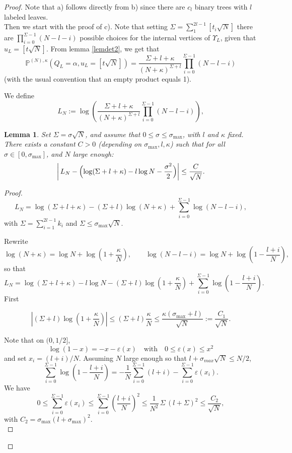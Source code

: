 \documentclass[10pt,a4paper]{amsart}
\newtheorem{lemma}{Lemma}
\begin{document}
\begin{proof}
Note that a) follows directly from b) since there are $c_l$ binary trees with $l$ labeled leaves.\\
Then we start with the proof of c). Note that setting $\Sigma=\sum_1^{2l-1}[t_i\sqrt N]$
 there are $\prod_{i=0}^{\Sigma-1}(N-l-i)$ possible choices for the internal vertices of $\Upsilon_L$, given that $u_L=[t\sqrt N]$.
From lemma \ref{lemdet2}, we get that $$\mathbb P^{(N),\kappa} (Q_L=\alpha, u_L=[t\sqrt N])=\frac{\Sigma+l+\kappa}{(N+\kappa)^{\Sigma+l}}\prod_{i=0}^{\Sigma -1}(N-l-i)$$ (with the usual convention that an empty product equals 1).
 

We define
\[
L_N:=\log(\frac{\Sigma+l+\kappa}{(N+\kappa)^{\Sigma+l}}\prod_{i=0}^{\Sigma-1}(N-l-i)),\]

\begin{lemma}
Set $\Sigma=\sigma\sqrt N$, and assume that
$0\le \sigma\le \sigma_{\max}$, with \(l\) and \(\kappa\) fixed.  
There exists a constant \(C>0\)  (depending on
\(\sigma_{\max},l,\kappa\)) such that for all 
\(\sigma\in[0,\sigma_{\max}]\), and $N$ large enough:
\[
\left|\,L_N-\Bigl(\log(\Sigma+l+\kappa)-l\log N-\frac{\sigma^2}{2}\Bigr)\right|
\le \frac{C}{\sqrt N}.
\]
\end{lemma}
\begin{proof}

\[
L_N=\log(\Sigma+l+\kappa)-(\Sigma+l)\log(N+\kappa)
+\sum_{i=0}^{\Sigma-1}\log(N-l-i),
\]
with $\Sigma=\sum_{i=1}^{2l-1}k_i$ and
$\Sigma\le \sigma_{\max}\sqrt N$.

\medskip
\noindent
Rewrite
\[
\log(N+\kappa)=\log N+\log\!\left(1+\frac{\kappa}{N}\right),
\qquad
\log(N-l-i)=\log N+\log\!\left(1-\frac{l+i}{N}\right),
\]
so that
\[
L_N=\log(\Sigma+l+\kappa)-l\log N
-(\Sigma+l)\log\!\left(1+\frac{\kappa}{N}\right)
+\sum_{i=0}^{\Sigma-1}\log\!\left(1-\frac{l+i}{N}\right).
\]
First

\[
\left|(\Sigma+l)\log\!\left(1+\frac{\kappa}{N}\right)\right|
\le
(\Sigma+l)\frac{\kappa}{N}\le
\frac{\kappa(\sigma_{\max}+l)}{\sqrt N}
:=
\frac{C_1}{\sqrt N}.
\]

\medskip
\noindent
Note that on $(0, 1/2]$,
\[
\log(1-x)=-x-\varepsilon(x)
\quad \text{with}\quad
0\le \varepsilon(x) \le x^2
\]
and set $x_i=(l+i)/N$. Assuming $N$ large enough so that $l+\sigma_{max}\sqrt N\le N/2$,
\[
\sum_{i=0}^{\Sigma-1}\log\!\left(1-\frac{l+i}{N}\right)
=
-\frac1N\sum_{i=0}^{\Sigma-1}(l+i)
-\sum_{i=0}^{\Sigma-1}\varepsilon(x_i).
\]
\medskip
\noindent
We have
\[
0\le \sum_{i=0}^{\Sigma-1}\varepsilon(x_i)
\le
\sum_{i=0}^{\Sigma-1}\left(\frac{l+i}{N}\right)^2
\le
\frac{1}{ N^2}\,\Sigma\,(l+\Sigma)^2
\le
\frac{C_2}{\sqrt N},
\]
with $C_2=\sigma_{\max}(l+\sigma_{\max})^2$.\\


\end{proof}
\end{proof}
\end{document}
